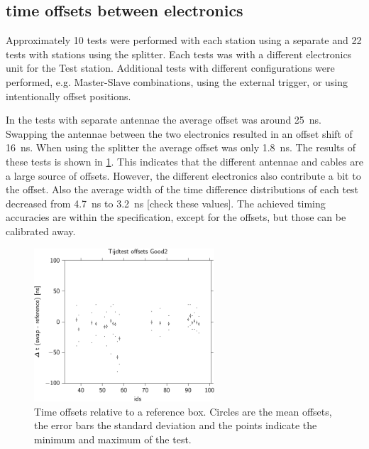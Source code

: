 \subsection{\gps time offsets between \hisparc electronics}
\label{sub:gps_offsets}

Approximately 10 tests were performed with each station using a separate \gps and 22 tests with stations using the \gps splitter. Each tests was with a different \hisparc electronics unit for the Test station. Additional tests with different configurations were performed, e.g. Master-Slave combinations, using the external trigger, or using intentionally offset \gps positions.

In the tests with separate \gps antennae the average offset was around \SI{25}{\ns}. Swapping the \gps antennae between the two electronics resulted in an offset shift of \SI{16}{\ns}. When using the splitter the average offset was only \SI{1.8}{\ns}. The results of these tests is shown in \cref{fig:hisparc_offsets}. This indicates that the different \gps antennae and cables are a large source of offsets. However, the different \hisparc electronics also contribute a bit to the offset. Also the average width of the time difference distributions of each test decreased from \SI{4.7}{\ns} to \SI{3.2}{\ns} [check these values]. The achieved timing accuracies are within the specification, except for the offsets, but those can be calibrated away.

\begin{figure}
    \centering
    \includegraphics[width=0.6\textwidth]
                    {plots/cluster/hisparc_offsets}
    \caption{Time offsets relative to a reference box. Circles are the
             mean offsets, the error bars the standard deviation and the
             points indicate the minimum and maximum of the test.}
    \label{fig:hisparc_offsets}
\end{figure}


